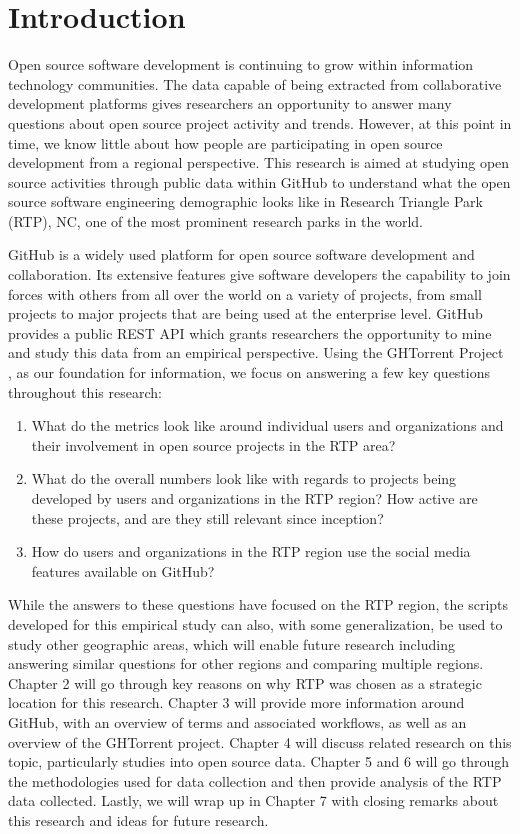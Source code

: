 \chapter{Introduction}
\label{Chapter:Introduction}

Open source software development is continuing to grow within information technology communities. The data capable of being extracted from collaborative development platforms gives researchers an opportunity to answer many questions about open source project activity and trends. However, at this point in time, we know little about how people are participating in open source development from a regional perspective. This research is aimed at studying open source activities through public data within GitHub \cite{_github_2016} to understand what the open source software engineering demographic looks like in Research Triangle Park (RTP), NC, one of the most prominent research parks in the world. 

GitHub is a widely used platform for open source software development and collaboration. Its extensive features give software developers the capability to join forces with others from all over the world on a variety of projects, from small projects to major projects that are being used at the enterprise level. GitHub provides a public REST API which grants researchers the opportunity to mine and study this data from an empirical perspective. Using the GHTorrent Project \cite{gousios_ghtorrent:_2012}, \cite{gousios_ghtorent_2013} as our foundation for information, we focus on answering a few key questions throughout this research:
\begin{enumerate}
\item What do the metrics look like around individual users and organizations and their involvement in open source projects in the RTP area? 
\item What do the overall numbers look like with regards to projects being developed by users and organizations in the RTP region? How active are these projects, and are they still relevant since inception?  
\item How do users and organizations in the RTP region use the social media features available on GitHub?
\end{enumerate}

While the answers to these questions have focused on the RTP region, the scripts developed for this empirical study can also, with some generalization, be used to study other geographic areas, which will enable future research including answering similar questions for other regions and comparing multiple regions. Chapter 2 will go through key reasons on why RTP was chosen as a strategic location for this research. Chapter 3 will provide more information around GitHub, with an overview of terms and associated workflows, as well as an overview of the GHTorrent project. Chapter 4 will discuss related research on this topic, particularly studies into open source data. Chapter 5 and 6 will go through the methodologies used for data collection and then provide analysis of the RTP data collected. Lastly, we will wrap up in Chapter 7 with closing remarks about this research and ideas for future research. 

